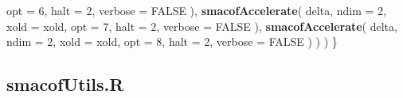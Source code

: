 \documentclass[
  12pt,
]{article}
\newenvironment{Shaded}{\begin{snugshade}}{\end{snugshade}}
\newcommand{\AttributeTok}[1]{\textcolor[rgb]{0.13,0.29,0.53}{#1}}
\newcommand{\ConstantTok}[1]{\textcolor[rgb]{0.56,0.35,0.01}{#1}}
\newcommand{\DecValTok}[1]{\textcolor[rgb]{0.00,0.00,0.81}{#1}}
\newcommand{\FunctionTok}[1]{\textcolor[rgb]{0.13,0.29,0.53}{\textbf{#1}}}
\newcommand{\NormalTok}[1]{#1}
\begin{document}
\begin{Shaded}
\begin{Highlighting}[]
        \AttributeTok{opt =} \DecValTok{6}\NormalTok{,}
        \AttributeTok{halt =} \DecValTok{2}\NormalTok{,}
        \AttributeTok{verbose =} \ConstantTok{FALSE}
\NormalTok{      ),}
      \FunctionTok{smacofAccelerate}\NormalTok{(}
\NormalTok{        delta,}
        \AttributeTok{ndim =} \DecValTok{2}\NormalTok{,}
        \AttributeTok{xold =}\NormalTok{ xold,}
        \AttributeTok{opt =} \DecValTok{7}\NormalTok{,}
        \AttributeTok{halt =} \DecValTok{2}\NormalTok{,}
        \AttributeTok{verbose =} \ConstantTok{FALSE}
\NormalTok{      ),}
      \FunctionTok{smacofAccelerate}\NormalTok{(}
\NormalTok{        delta,}
        \AttributeTok{ndim =} \DecValTok{2}\NormalTok{,}
        \AttributeTok{xold =}\NormalTok{ xold,}
        \AttributeTok{opt =} \DecValTok{8}\NormalTok{,}
        \AttributeTok{halt =} \DecValTok{2}\NormalTok{,}
        \AttributeTok{verbose =} \ConstantTok{FALSE}
\NormalTok{      )}
\NormalTok{    )}
\NormalTok{  )}
\NormalTok{\}}
\end{Highlighting}
\end{Shaded}

\subsection{smacofUtils.R}\label{smacofutils.r}
\end{document}
